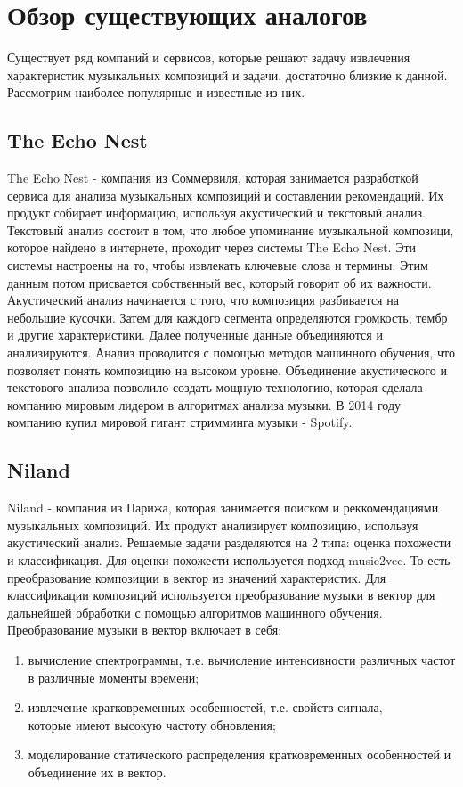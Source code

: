 \section{Обзор существующих аналогов}
\label{sec:analogues}

Существует ряд компаний и сервисов, которые решают задачу извлечения характеристик музыкальных композиций и задачи, достаточно близкие к данной. Рассмотрим наиболее популярные и известные из них.

\subsection{The Echo Nest}
\label{sec:analogues:ten}
The Echo Nest - компания из Соммервиля, которая занимается разработкой сервиса для анализа музыкальных композиций и составлении рекомендаций. Их продукт собирает информацию, используя акустический и текстовый анализ. Текстовый анализ состоит в том, что любое упоминание музыкальной композици, которое найдено в интернете, проходит через системы The Echo Nest. Эти системы настроены на то, чтобы извлекать ключевые слова и термины. Этим данным потом присвается собственный вес, который говорит об их важности. Акустический анализ начинается с того, что композиция разбивается на небольшие кусочки. Затем для каждого сегмента определяются громкость, тембр и другие характеристики. Далее полученные данные объединяются и анализируются. Анализ проводится с помощью методов машинного обучения, что позволяет понять композицию на высоком уровне. Объединение акустического и текстового анализа позволило создать мощную технологию, которая сделала компанию мировым лидером в алгоритмах анализа музыки. В 2014 году компанию купил мировой гигант стримминга музыки - Spotify.

\subsection{Niland}
\label{sec:analogues:niland}
Niland - компания из Парижа, которая занимается поиском и реккомендациями музыкальных композиций. Их продукт анализирует композицию, используя акустический анализ. Решаемые задачи разделяются на 2 типа: оценка похожести и классификация. Для оценки похожести используется подход music2vec. То есть преобразование композиции в вектор из значений характеристик. Для классификации композиций используется преобразование музыки в вектор для дальнейшей обработки с помощью алгоритмов машинного обучения. Преобразование музыки в вектор включает в себя:
\begin{enumerate}
    \item вычисление спектрограммы, т.е. вычисление интенсивности различных частот в различные моменты времени;
    \item извлечение кратковременных особенностей, т.е. свойств сигнала, \\которые имеют высокую частоту обновления;
    \item моделирование статического распределения кратковременных особенностей и объединение их в вектор.
\end{enumerate}

